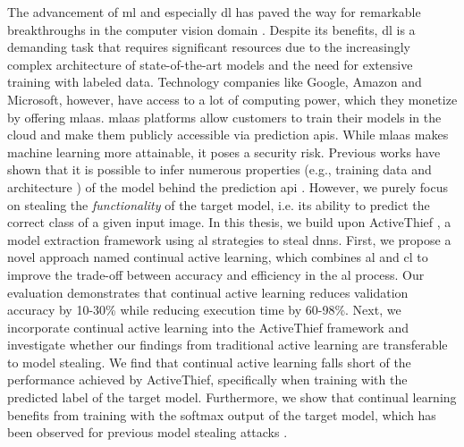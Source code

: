 \Abstract
The advancement of \gls{ml} and especially \gls{dl} has paved the way for remarkable breakthroughs in the computer vision domain 
\parencite*{goodfellow2020generative,he2016deep,lecun1989backpropagation}. Despite its benefits, \gls{dl} is a demanding task that requires significant resources due
to the increasingly complex architecture of state-of-the-art models and the need for extensive training with labeled data. Technology companies like Google,
Amazon and Microsoft, however, have access to a lot of computing power, which they monetize by offering \gls{mlaas}. \gls{mlaas} platforms allow customers to
train their models in the cloud and make them publicly accessible via prediction \glspl{api}. While \gls{mlaas} makes machine learning more
attainable, it poses a security risk. Previous works have shown that it is possible to infer numerous properties (e.g., training data \cite{shokri2017membership}
and architecture \cite{oh2019towards}) of the model behind the prediction \gls{api} \parencite{papernot2017practical,tramer2016stealing}.
However, we purely focus on stealing the \textit{functionality} of the target model, i.e. its ability to predict the correct class of a given input image.
In this thesis, we build upon ActiveThief \cite{pal2020activethief}, a model extraction framework using \gls{al} strategies to steal \glspl{dnn}. 
First, we propose a novel approach named continual active learning, which combines \gls{al} and \gls{cl} to improve the trade-off between
accuracy and efficiency in the \gls{al} process. Our evaluation demonstrates that continual active learning reduces validation accuracy by 10-30\%
while reducing execution time by 60-98\%. Next, we incorporate continual active learning into the ActiveThief framework and investigate whether our findings
from traditional active learning are transferable to model stealing. We find that continual active learning falls short of the performance achieved by ActiveThief,
specifically when training with the predicted label of the target model. Furthermore, we show that continual learning benefits from training with the softmax
output of the target model, which has been observed for previous model stealing attacks \parencite{orekondy2019knockoff,pal2020activethief}.
